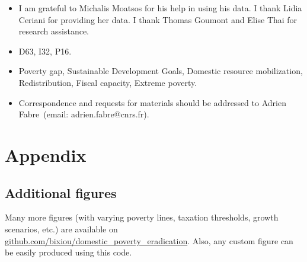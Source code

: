 \begin{itemize}
\item[Acknowledgments] I am grateful to Michalis Moatsos for his help in using his data. I thank Lidia Ceriani for providing her data. I thank Thomas Goumont and Elise Thai for research assistance. 
\item[JEL codes] D63, I32, P16.
\item[Keywords]  Poverty gap, Sustainable Development Goals, Domestic resource mobilization, Redistribution, Fiscal capacity, Extreme poverty.
\item[Correspondence] Correspondence and requests for materials should be addressed to Adrien Fabre~(email: adrien.fabre@cnrs.fr).
\end{itemize}

\listoftables
\listoffigures

\appendix %
\renewcommand{\thetable}{A\arabic{table}}
\renewcommand{\thefigure}{A\arabic{figure}}
\setcounter{figure}{0}
\setcounter{table}{0}

\clearpage
\section{Appendix}
\subsection{Additional figures}

Many more figures (with varying poverty lines, taxation thresholds, growth scenarios, etc.) are available on \href{https://github.com/bixiou/domestic_poverty_eradication/tree/main/figures}{github.com/bixiou/domestic\_poverty\_eradication}. Also, any custom figure can be easily produced using this code.



